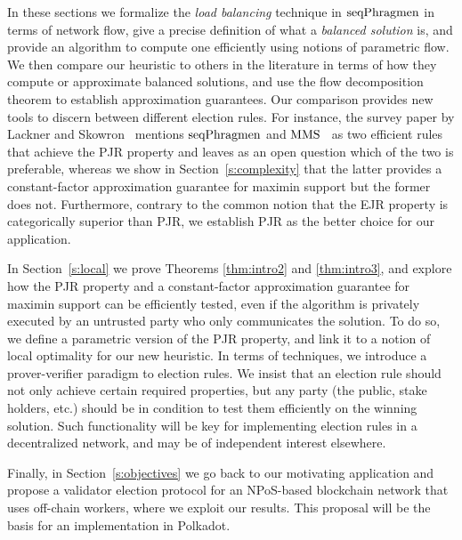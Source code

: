 In these sections we formalize the \emph{load balancing} technique in $\operatorname{seqPhragmen}$ in terms of network flow, give a precise definition of what a \emph{balanced solution} is, and provide an algorithm to compute one efficiently using notions of parametric flow. We then compare our heuristic to others in the literature in terms of how they compute or approximate balanced solutions, and use the flow decomposition theorem to establish approximation guarantees. Our comparison provides new tools to discern between different election rules. For instance, the survey paper by Lackner and Skowron~\cite{lackner2020approval} mentions $\operatorname{seqPhragmen}$ and $\operatorname{MMS}$~\cite{sanchez2016maximin} as two efficient rules that achieve the PJR property and leaves as an open question which of the two is preferable, whereas we show in Section~\ref{s:complexity} that the latter provides a constant-factor approximation guarantee for maximin support but the former does not. 
Furthermore, contrary to the common notion that the EJR property is categorically superior than PJR, we establish PJR as the better choice for our application.

In Section~\ref{s:local} we prove Theorems \ref{thm:intro2} and \ref{thm:intro3}, and explore how the PJR property and a constant-factor approximation guarantee for maximin support can be efficiently tested, even if the algorithm is privately executed by an untrusted party who only communicates the solution. 
To do so, we define a parametric version of the PJR property, and link it to a notion of local optimality for our new heuristic. 
In terms of techniques, we introduce a prover-verifier paradigm to election rules. We insist that an election rule should not only achieve certain required properties, but any party (the public, stake holders, etc.) should be in condition to test them efficiently on the winning solution. Such functionality will be key for implementing election rules in a decentralized network, and may be of independent interest elsewhere. 

Finally, in Section~\ref{s:objectives} we go back to our motivating application and propose a validator election protocol for an NPoS-based blockchain network that uses off-chain workers, where we exploit our results. This proposal will be the basis for an implementation in Polkadot. 
